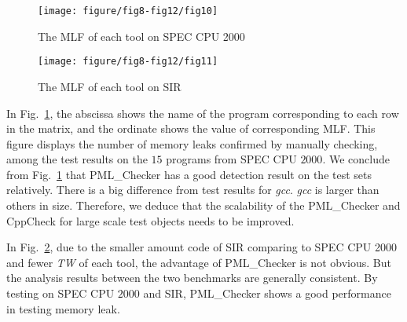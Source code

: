 \begin{figure}[!h]
\center
\texttt{[image: figure/fig8-fig12/fig10]}
\caption{The MLF of each tool on SPEC CPU 2000}
\label{fig:10}
\end{figure}

\begin{figure}[!h]
\center
\texttt{[image: figure/fig8-fig12/fig11]}
\caption{The MLF of each tool on SIR}
\label{fig:11}
\end{figure}

In Fig.~\ref{fig:10}, the abscissa shows the name of the program corresponding to each row in the matrix, and the ordinate shows the value of corresponding MLF. This figure displays the number of memory leaks confirmed by manually checking, among the test results on the $15$ programs from SPEC CPU $2000$. We conclude from Fig.~\ref{fig:10} that PML\_Checker has a good detection result on the test sets relatively. There is a big difference from test results for \textit{gcc}. \textit{gcc} is larger than others in size. Therefore, we deduce that the scalability of the PML\_Checker and CppCheck for large scale test objects needs to be improved. 

In Fig.~\ref{fig:11}, due to the smaller amount code of SIR comparing to SPEC CPU 2000 and fewer \textit{TW} of each tool, the advantage of PML\_Checker is not obvious. But the analysis results between the two benchmarks are generally consistent. By testing on SPEC CPU $2000$ and SIR, PML\_Checker shows a good performance in testing memory leak.

